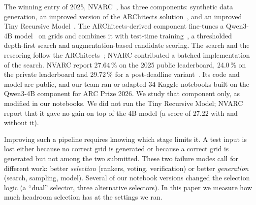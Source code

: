 \documentclass[11pt]{article}
\begin{document}
The winning entry of 2025, NVARC~\citep{nvarc2025}, has three components: synthetic data generation, an improved version of the ARChitects solution~\citep{franzen2025poe}, and an improved Tiny Recursive Model~\citep{jolicoeur2025trm}.
The ARChitects-derived component fine-tunes a Qwen3-4B model~\citep{qwen3} on grids and combines it with test-time training~\citep{akyurek2024ttt}, a thresholded depth-first search and augmentation-based candidate scoring. The search and the rescoring follow the ARChitects~\citep{franzen2025poe}; NVARC contributed a batched implementation of the search.
NVARC report 27.64\,\% on the 2025 public leaderboard, 24.0\,\% on the private leaderboard and 29.72\,\% for a post-deadline variant~\citep{nvarc2025}.
Its code and model are public, and our team ran or adapted 34 Kaggle notebooks built on the Qwen3-4B component for ARC Prize 2026. We study that component only, as modified in our notebooks. We did not run the Tiny Recursive Model; NVARC report that it gave no gain on top of the 4B model (a score of 27.22 with and without it).

Improving such a pipeline requires knowing which stage limits it. A test input is lost either because no correct grid is generated or because a correct grid is generated but not among the two submitted. These two failure modes call for different work: better \emph{selection} (rankers, voting, verification) or better \emph{generation} (search, sampling, model).
Several of our notebook versions changed the selection logic (a ``dual'' selector, three alternative selectors). In this paper we measure how much headroom selection has at the settings we ran.
\end{document}
